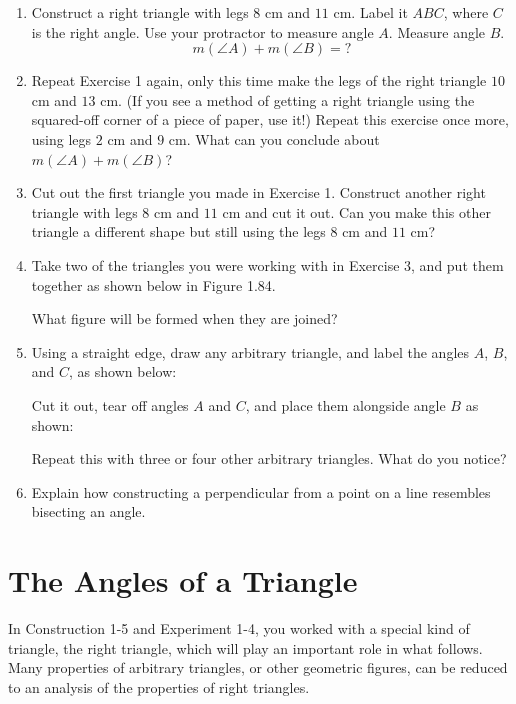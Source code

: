 \documentclass[12pt]{book} %
\begin{document}
\begin{enumerate}
\item Construct a right triangle with legs $8$ cm and $11$ cm. Label it $ABC$, where $C$ is the right angle. Use your protractor to measure angle $A$. Measure angle $B$.
\[
m(\angle A)+m(\angle B)=?
\]

\item Repeat Exercise 1 again, only this time make the legs of the right triangle $10$ cm and $13$ cm. (If you see a method of getting a right triangle using the squared-off corner of a piece of paper, use it!) Repeat this exercise once more, using legs $2$ cm and $9$ cm. What can you conclude about $m(\angle A)+m(\angle B)$?

\item Cut out the first triangle you made in Exercise 1. Construct another right triangle with legs $8$ cm and $11$ cm and cut it out. Can you make this other triangle a different shape but still using the legs $8$ cm and $11$ cm?

\item Take two of the triangles you were working with in Exercise 3, and put them together as shown below in Figure 1.84.


What figure will be formed when they are joined?

\item Using a straight edge, draw any arbitrary triangle, and label the angles $A$, $B$, and $C$, as shown below:


Cut it out, tear off angles $A$ and $C$, and place them alongside angle $B$ as shown:


Repeat this with three or four other arbitrary triangles. What do you notice?

\item Explain how constructing a perpendicular from a point on a line resembles bisecting an angle.
\end{enumerate}

\section{The Angles of a Triangle}

In Construction 1-5 and Experiment 1-4, you worked with a special kind of triangle, the right triangle, which will play an important role in what follows. Many properties of arbitrary triangles, or other geometric figures, can be reduced to an analysis of the properties of right triangles.
\end{document}
